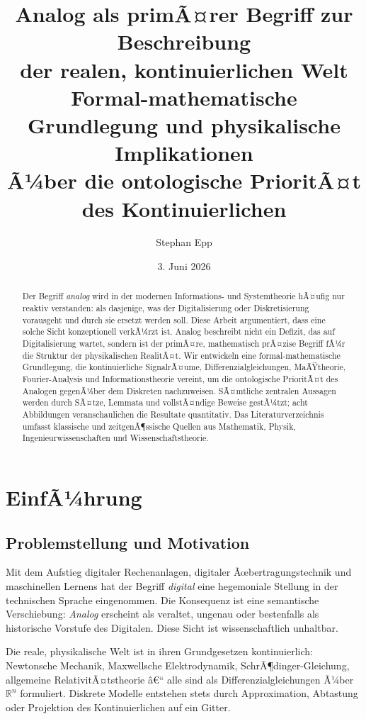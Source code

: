 ﻿\documentclass[a4paper,12pt]{article}
\title{\textbf{Analog als primÃ¤rer Begriff zur Beschreibung\\
der realen, kontinuierlichen Welt}\\[0.5em]
\large Formal-mathematische Grundlegung und physikalische Implikationen\\
Ã¼ber die ontologische PrioritÃ¤t des Kontinuierlichen}
\author{Stephan Epp\\}
\date{3. Juni 2026}
\theoremstyle{definition}
\begin{document}
\maketitle

\begin{abstract}
\noindent
Der Begriff \emph{analog} wird in der modernen Informations- und Systemtheorie hÃ¤ufig nur reaktiv
verstanden: als dasjenige, was der Digitalisierung oder Diskretisierung vorausgeht und durch sie
ersetzt werden soll.  Diese Arbeit argumentiert, dass eine solche Sicht konzeptionell verkÃ¼rzt ist.
Analog beschreibt nicht ein Defizit, das auf Digitalisierung wartet, sondern ist der primÃ¤re,
mathematisch prÃ¤zise Begriff fÃ¼r die Struktur der physikalischen RealitÃ¤t.
Wir entwickeln eine formal-mathematische Grundlegung, die kontinuierliche SignalrÃ¤ume,
Differenzialgleichungen, MaÃŸtheorie, Fourier-Analysis und Informationstheorie vereint,
um die ontologische PrioritÃ¤t des Analogen gegenÃ¼ber dem Diskreten nachzuweisen.
SÃ¤mtliche zentralen Aussagen werden durch SÃ¤tze, Lemmata und vollstÃ¤ndige Beweise gestÃ¼tzt;
acht Abbildungen veranschaulichen die Resultate quantitativ.
Das Literaturverzeichnis umfasst klassische und zeitgenÃ¶ssische Quellen aus Mathematik,
Physik, Ingenieurwissenschaften und Wissenschaftstheorie.
\end{abstract}

\tableofcontents
\newpage

\section{EinfÃ¼hrung}

\subsection{Problemstellung und Motivation}

Mit dem Aufstieg digitaler Rechenanlagen, digitaler Ãœbertragungstechnik und
maschinellen Lernens hat der Begriff \emph{digital} eine hegemoniale Stellung in der
technischen Sprache eingenommen.  Die Konsequenz ist eine semantische Verschiebung:
\emph{Analog} erscheint als veraltet, ungenau oder bestenfalls als historische
Vorstufe des Digitalen.  Diese Sicht ist wissenschaftlich unhaltbar.

Die reale, physikalische Welt ist in ihren Grundgesetzen kontinuierlich:
Newtonsche Mechanik, Maxwellsche Elektrodynamik, SchrÃ¶dinger-Gleichung, allgemeine
RelativitÃ¤tstheorie â€“ alle sind als Differenzialgleichungen Ã¼ber $\mathbb{R}^n$
formuliert.  Diskrete Modelle entstehen stets durch Approximation, Abtastung oder
Projektion des Kontinuierlichen auf ein Gitter.
\end{document}
